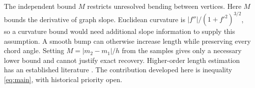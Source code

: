 The independent bound $M$ restricts unresolved bending between vertices.
Here $M$ bounds the derivative of graph slope. Euclidean curvature is
$|f''|/(1+f'^2)^{3/2}$, so a curvature bound would need additional slope
information to supply this assumption.
A smooth bump can otherwise increase length while preserving every chord
angle. Setting $M=|m_2-m_1|/h$ from the samples gives only a necessary
lower bound and cannot justify exact recovery. Higher-order length
estimation has an established literature \cite{floater}. The contribution
developed here is inequality \eqref{eq:main}, with historical priority open.
